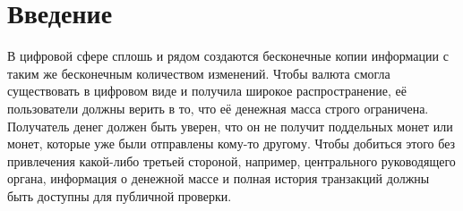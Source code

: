 \chapter{Введение}
\label{chapter:introduction}

В цифровой сфере сплошь и рядом создаются бесконечные копии информации с таким же бесконечным количеством изменений. Чтобы валюта смогла существовать в цифровом виде и получила широкое распространение, её пользователи должны верить в то, что её денежная масса строго ограничена. Получатель денег должен быть уверен, что он не получит поддель\-ных монет или монет, которые уже были отправлены кому-то другому. Чтобы добиться этого без привлечения какой-либо третьей стороной, например, центрального руководящего органа, информация о денежной массе и полная история транзакций должны быть доступны для публичной проверки.

